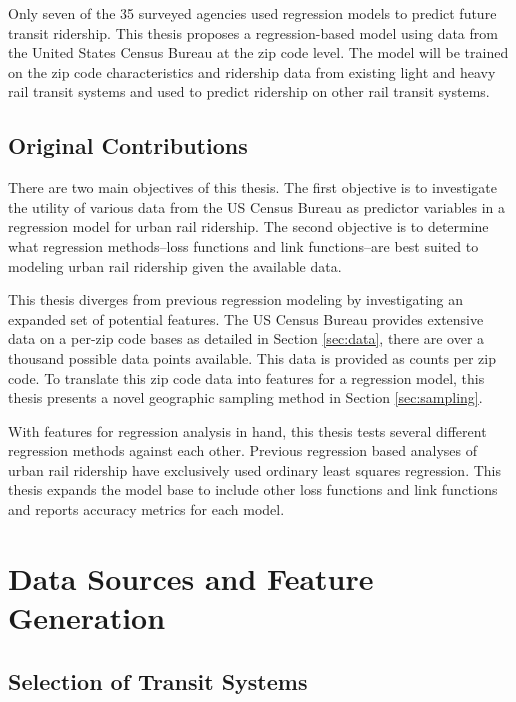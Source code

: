 \documentclass[11pt]{article}
\begin{document}
Only seven of the 35 surveyed agencies used regression models to predict future transit ridership. This thesis proposes a regression-based model using data from the United States Census Bureau at the zip code level. The model will be trained on the zip code characteristics and ridership data from existing light and heavy rail transit systems and used to predict ridership on other rail transit systems.  

\subsection{Original Contributions}

There are two main objectives of this thesis. The first objective is to investigate the utility of various data from the US Census Bureau as predictor variables in a regression model for urban rail ridership. The second objective is to determine what regression methods--loss functions and link functions--are best suited to modeling urban rail ridership given the available data.

This thesis diverges from previous regression modeling by investigating an expanded set of potential features. The US Census Bureau provides extensive data on a per-zip code bases as detailed in Section \ref{sec:data}, there are over a thousand possible data points available. This data is provided as counts per zip code. To translate this zip code data into features for a regression model, this thesis presents a novel geographic sampling method in Section \ref{sec:sampling}. 

With features for regression analysis in hand, this thesis tests several different regression methods against each other. Previous regression based analyses of urban rail ridership have exclusively used ordinary least squares regression. This thesis expands the model base to include other loss functions and link functions and reports accuracy metrics for each model. 

\section{Data Sources and Feature Generation}

\subsection{Selection of Transit Systems}
\end{document}

